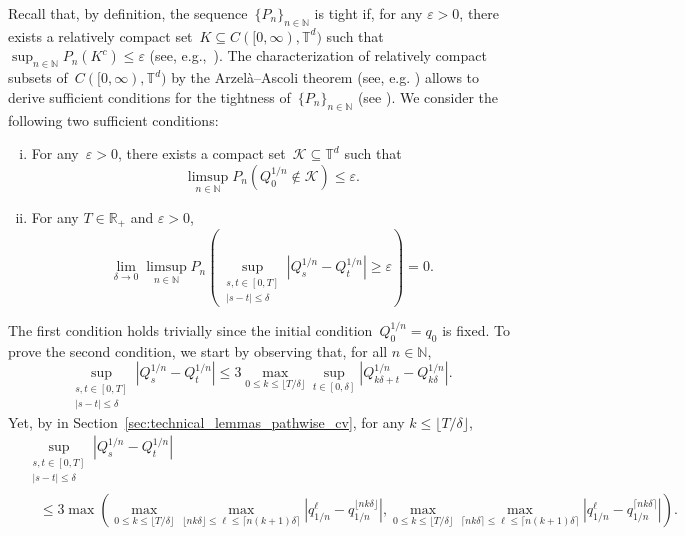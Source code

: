 \documentclass{article}
\newcommand{\R}{\mathbb{R}}
\renewcommand{\leq}{\leqslant}
\renewcommand{\geq}{\geqslant}
\def\N{\mathbb{N}}
\def\R{\mathbb{R}}
\def\T{\mathbb{T}}
\renewcommand{\dim}{d}
\begin{document}
Recall that, by definition, the sequence~$\{P_n\}_{n\in\N}$ is tight if, for any $\varepsilon>0$, there exists a relatively compact set~$K\subseteq C([0,\infty), \T^\dim)$ such that $\sup_{n\in\N} P_n(K^c)\leq \varepsilon$ (see, e.g.,~\cite[Section~5]{billing}). The characterization of relatively compact subsets of~$C([0,\infty), \T^\dim)$ by the Arzelà--Ascoli theorem (see, e.g. \cite[Theorem~7.2]{billing}) allows to derive sufficient conditions for the tightness of~$\{P_n\}_{n\in\N}$  (see \cite[Theorem~7.3]{billing}). We consider the following two sufficient conditions:
\begin{enumerate}[(i)]
\item For any~$\varepsilon>0$, there exists a compact set~$\mathscr{K}\subseteq \T^\dim$ such that
  \[
  \limsup_{n\in\N} P_n\left(Q_0^{1/n}\notin \mathscr{K}\right)\leq \varepsilon.
  \]
 \item For any $T\in\R_+$ and $\varepsilon>0$,
   \[
   \lim_{\delta\to 0}\limsup_{n\in\N}P_n\left(\sup_{\substack{s,t\in[0,T]\\|s-t|\leq \delta}}\left|Q^{1/n}_s-Q^{1/n}_t\right|\geq \varepsilon\right)=0.
   \]
\end{enumerate}
The first condition holds trivially since the initial condition~$Q_0^{1/n} = q_0$ is fixed. To prove the second condition, we start by observing that, for all $n\in\N$, 
\[
\sup_{\substack{s,t\in[0,T]\\|s-t|\leq \delta}}\left|Q^{1/n}_s-Q^{1/n}_t\right| \leq 3\max_{0\leq k \leq \lfloor T/\delta \rfloor}\sup_{t\in[0,\delta]}\left|Q^{1/n}_{k\delta +t}-Q^{1/n}_{k\delta}\right|.
\]
Yet, by  in Section~\ref{sec:technical_lemmas_pathwise_cv}, for any $k\leq \lfloor T/\delta \rfloor$,
\[
\begin{aligned}
& \sup_{\substack{s,t\in[0,T]\\|s-t|\leq \delta}}\left|Q^{1/n}_s-Q^{1/n}_t\right| \\
& \quad \leq
3\max\left(\max_{0\leq k \leq \lfloor T/\delta \rfloor}\max_{\lfloor nk\delta \rfloor \leq \ell\leq \lceil n(k+1)\delta \rceil} \left|q_{1/n}^\ell - q_{1/n}^{\lfloor nk\delta \rfloor}\right|,\max_{0\leq k \leq \lfloor T/\delta \rfloor}\max_{\lceil nk\delta \rceil \leq \ell\leq \lceil n(k+1)\delta \rceil} \left|q_{1/n}^\ell - q_{1/n}^{\lceil nk\delta \rceil}\right|\right).
\end{aligned}
\]
\end{document}
